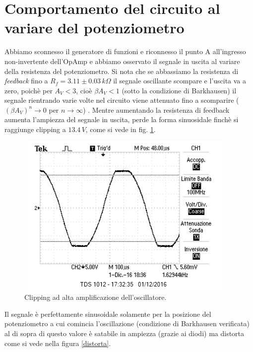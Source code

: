 \documentclass[10pt,a4paper]{article}
\begin{document}
\section{Comportamento del circuito al variare del potenziometro}
Abbiamo sconnesso il generatore di funzioni e riconnesso il punto A all'ingresso non-invertente dell'OpAmp e abbiamo osservato il segnale in uscita al variare della resistenza del potenziometro. Si nota che se abbassiamo la resistenza di \emph{feedback} fino a $R_{f} = 3.11 \pm 0.03 \, k\Omega$ il segnale oscillante scompare e l'uscita va a zero, poichè per $A_V < 3$, cioè $\beta A_V < 1$ (sotto la condizione di Barkhausen) il segnale rientrando varie volte nel circuito viene attenuato fino a scomparire ( $(\beta A_V)^n \rightarrow 0$ per $n \rightarrow \infty$) . Mentre aumentando la resistenza di feedback aumenta l'ampiezza del segnale in uscita, perde la forma sinuosidale finchè si raggiunge clipping a $13.4\,V$, come si vede in fig. \ref{clipping}.

\begin{figure}[!htb]
  \centering
  \includegraphics[scale=.5]{clipping.png}
\caption{Clipping ad alta amplificazione dell'oscillatore.}
\label{clipping}
\end{figure}

Il segnale è perfettamente sinusoidale solamente per la posizione del potenziometro a cui comincia l'oscillazione (condizione di Barkhausen verificata) al di sopra di questo valore è satabile in ampiezza (grazie ai diodi) ma distorta come si vede nella figura \ref{distorta}.\\
\end{document}
